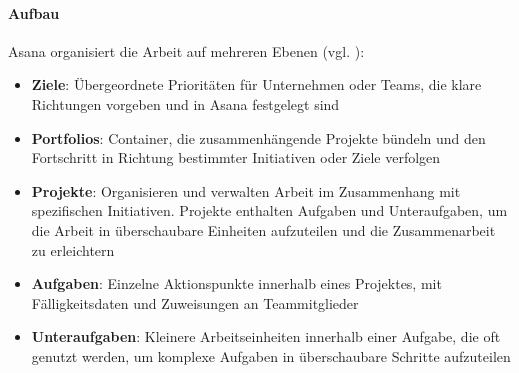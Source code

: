 \documentclass[sigconf, nonacm]{acmart}
\begin{document}
\paragraph{Aufbau}
Asana organisiert die Arbeit auf mehreren Ebenen (vgl. \cite{noauthor_mit_nodate}):
\begin{itemize}
\item \textbf{Ziele}: Übergeordnete Prioritäten für Unternehmen oder Teams, die klare Richtungen vorgeben und in Asana festgelegt sind
\item \textbf{Portfolios}: Container, die zusammenhängende Projekte bündeln und den Fortschritt in Richtung bestimmter Initiativen oder Ziele verfolgen
\item \textbf{Projekte}: Organisieren und verwalten Arbeit im Zusammenhang mit spezifischen Initiativen. Projekte enthalten Aufgaben und Unteraufgaben, um die Arbeit in überschaubare Einheiten aufzuteilen und die Zusammenarbeit zu erleichtern
\item \textbf{Aufgaben}: Einzelne Aktionspunkte innerhalb eines Projektes, mit Fälligkeitsdaten und Zuweisungen an Teammitglieder
\item \textbf{Unteraufgaben}: Kleinere Arbeitseinheiten innerhalb einer Aufgabe, die oft genutzt werden, um komplexe Aufgaben in überschaubare Schritte aufzuteilen
\end{itemize}
\end{document}
